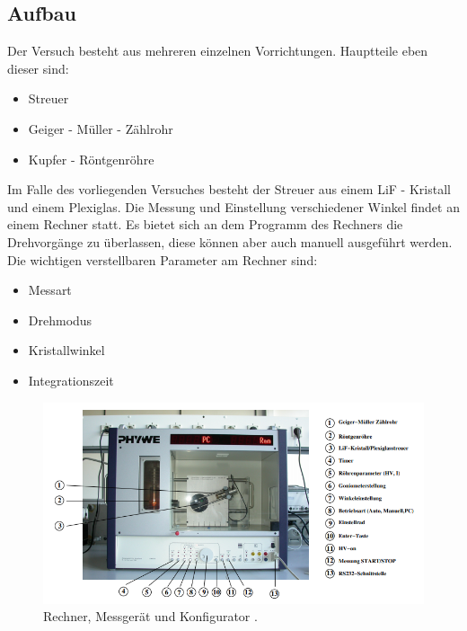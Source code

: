 \subsection{Aufbau}
Der Versuch besteht aus mehreren einzelnen Vorrichtungen. Hauptteile eben dieser sind:
\begin{itemize}
\item{Streuer}
\item{Geiger - Müller - Zählrohr}
\item{Kupfer - Röntgenröhre}
\end{itemize}
Im Falle des vorliegenden Versuches besteht der Streuer aus einem LiF - Kristall und einem Plexiglas. 
Die Messung und Einstellung verschiedener Winkel findet an einem Rechner statt. Es bietet sich an dem Programm des Rechners 
die Drehvorgänge zu überlassen, diese können aber auch manuell ausgeführt werden. 
Die wichtigen verstellbaren Parameter am Rechner sind:
\begin{itemize}
\item{Messart}
\item{Drehmodus}
\item{Kristallwinkel}
\item{Integrationszeit}
\end{itemize}
 
\begin{figure}
    \centering
    \includegraphics[width=\textwidth]{bilder/Screenshot 2021-01-29 104244.png}
    \caption{Rechner, Messgerät und Konfigurator \cite{skript}. } 
    \label{fig:Rechner}
\end{figure}

